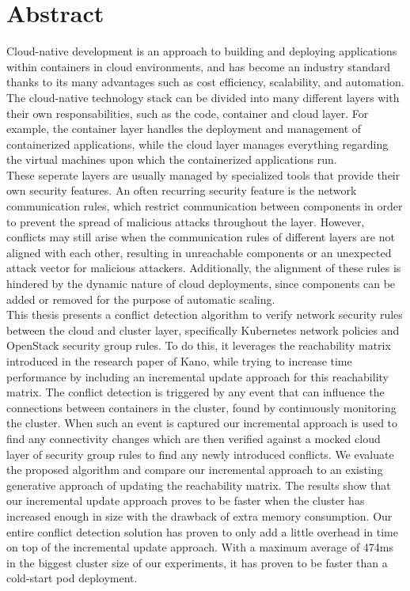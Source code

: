 \chapter{Abstract} \label{ch:abstract}
Cloud-native development is an approach to building and deploying applications within containers in cloud environments, and has become an industry standard thanks to its many advantages such as cost efficiency, scalability, and automation. The cloud-native technology stack can be divided into many different layers with their own responsabilities, such as the code, container and cloud layer. For example, the container layer handles the deployment and management of containerized applications, while the cloud layer manages everything regarding the virtual machines upon which the containerized applications run. 
\\[10pt]

These seperate layers are usually managed by specialized tools that provide their own security features. An often recurring security feature is the network communication rules, which restrict communication between components in order to prevent the spread of malicious attacks throughout the layer. However, conflicts may still arise when the communication rules of different layers are not aligned with each other, resulting in unreachable components or an unexpected attack vector for malicious attackers. Additionally, the alignment of these rules is hindered by the dynamic nature of cloud deployments, since components can be added or removed for the purpose of automatic scaling. 
\\[10pt]

This thesis presents a conflict detection algorithm to verify network security rules between the cloud and cluster layer, specifically Kubernetes network policies and OpenStack security group rules. To do this, it leverages the reachability matrix introduced in the research paper of Kano, while trying to increase time performance by including an incremental update approach for this reachability matrix. The conflict detection is triggered by any event that can influence the connections between containers in the cluster, found by continuously monitoring the cluster. When such an event is captured our incremental approach is used to find any connectivity changes which are then verified against a mocked cloud layer of security group rules to find any newly introduced conflicts. We evaluate the proposed algorithm and compare our incremental approach to an existing generative approach of updating the reachability matrix. The results show that our incremental update approach proves to be faster when the cluster has increased enough in size with the drawback of extra memory consumption. Our entire conflict detection solution has proven to only add a little overhead in time on top of the incremental update approach. With a maximum average of 474ms in the biggest cluster size of our experiments, it has proven to be faster than a cold-start pod deployment.
\cleardoublepage
